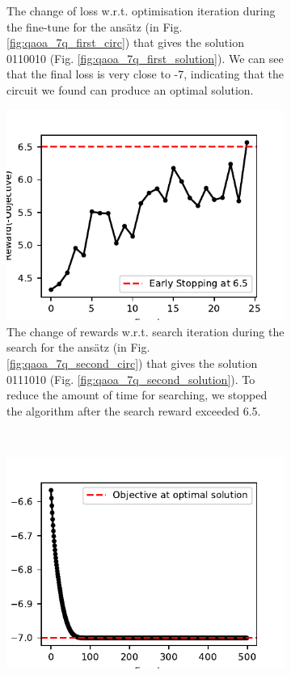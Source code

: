 \documentclass[a4paper,onecolumn,11pt]{quantumarticle}
\begin{document}
\begin{figure}[H]
\begin{subfigure}[t]{0.48\linewidth}
        \caption{The change of loss w.r.t. optimisation iteration during the fine-tune for the ans\"atz (in Fig.\ref{fig:qaoa_7q_first_circ}) that gives the solution 0110010 (Fig. \ref{fig:qaoa_7q_first_solution}). We can see that the final loss is very close to -7, indicating that the circuit we found can produce an optimal solution.}
        \label{fig:qaoa_finetune_1}
    \end{subfigure}
    \hfill
    \begin{subfigure}[b]{0.48\linewidth}
        \includegraphics[width=0.99\linewidth]{Figures/fig_qaoa_7q_2_search_rewards.pdf}
        \caption{The change of rewards w.r.t. search iteration during the search for the ans\"atz (in Fig.\ref{fig:qaoa_7q_second_circ}) that gives the solution 0111010 (Fig. \ref{fig:qaoa_7q_second_solution}). To reduce the amount of time for searching, we stopped the algorithm after the search reward exceeded 6.5.}
        \label{fig:qaoa_search_reward_2}
    \end{subfigure}
    ~
    \begin{subfigure}[b]{0.48\linewidth}
        \includegraphics[width=\linewidth]{Figures/fig_qaoa_7q_2_fine_tune_loss.pdf}

\end{subfigure}
\end{figure}
\end{document}
